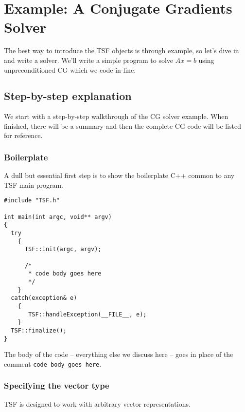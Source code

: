 \section{Example: A Conjugate Gradients Solver}

The best way to introduce the TSF objects is through example, so let's dive in and
write a solver. We'll write a simple program to solve $Ax=b$ using unpreconditioned
CG which we code in-line. 


\subsection{Step-by-step explanation}

We start with a step-by-step walkthrough of the CG solver example.
When finished, there will be a summary and then the complete CG code will be
listed for reference.

\subsubsection{Boilerplate}

A dull but essential first step is to show 
the boilerplate C++ common to any TSF main program. 
\begin{verbatim}
#include "TSF.h"

int main(int argc, void** argv)
{
  try
    {
      TSF::init(argc, argv);

      /*
       * code body goes here
       */
    }
  catch(exception& e)
    {
       TSF::handleException(__FILE__, e);
    }
  TSF::finalize();
}
\end{verbatim}
The body of the code -- everything else we discuss here -- goes in place 
of the comment {\tt code body goes here}. 

\subsubsection{Specifying the vector type}

TSF is designed to work with arbitrary vector representations. 

\begin{verbatim}

\end{verbatim}







